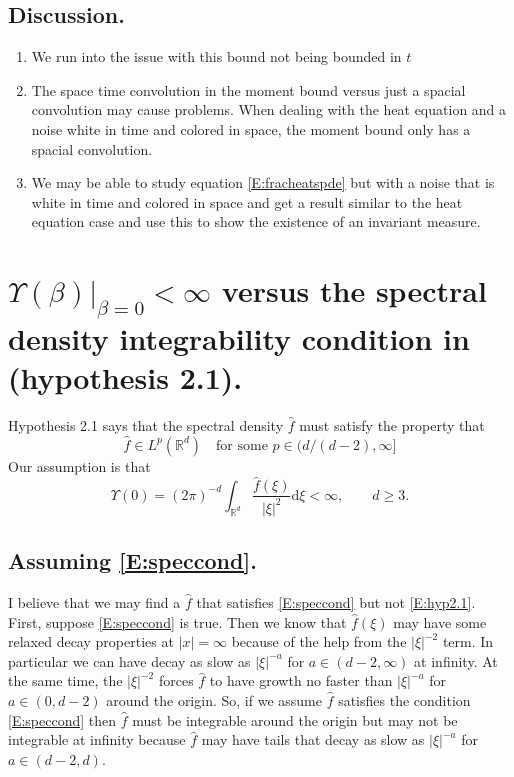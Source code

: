 \documentclass{article}
\numberwithin{equation}{section}
\newcommand{\R}{\mathbb{R}}
\newcommand{\ud}{\ensuremath{\mathrm{d}}}
\begin{document}
\subsection{Discussion.}
	\begin{enumerate}
		\item We run into the issue with this bound not being bounded in $t$
		\item The space time convolution in the moment bound versus just a spacial convolution may cause problems. When dealing with the heat equation and a noise white in time and colored in space, the moment bound only has a spacial convolution.
		\item We may be able to study equation \eqref{E:fracheatspde} but with a noise that is white in time and colored in space and get a result similar to the heat equation case and use this to show the existence of an invariant measure.
	\end{enumerate}

\section{$\Upsilon(\beta) \vert_{\beta =0} < \infty$ versus the spectral density integrability condition in \cite{TZ98} (hypothesis 2.1).}
Hypothesis 2.1 \cite{TZ98} says that the spectral density $\hat{f}$ must satisfy the property that
	\begin{equation}\label{E:hyp2.1}
 \hat{f} \in L^p(\R^d) \quad \text{for some } p \in (d/(d-2), \infty]
 	\end{equation}
Our assumption is that
	\begin{equation}\label{E:speccond}
		\Upsilon(0) = (2\pi)^{-d} \int_{\R^d} \frac{\hat{f}(\xi)}{|\xi|^2} \ud \xi < \infty, \quad \quad d \ge 3.
	\end{equation}

\subsection{Assuming \eqref{E:speccond}.}

I believe that we may find a $\hat{f}$ that satisfies \eqref{E:speccond} but not \eqref{E:hyp2.1}. First, suppose \eqref{E:speccond} is true. Then we know that $\hat{f}(\xi)$ may have some relaxed decay properties at $|x| = \infty$ because of the help from the $|\xi|^{-2}$ term. In particular we can have decay as slow as $|\xi|^{-a}$ for $a \in (d-2,\infty)$ at infinity. At the same time, the $|\xi|^{-2}$ forces $\hat{f}$ to have growth no faster than $|\xi|^{-a}$ for $a \in (0,d-2)$ around the origin. So, if we assume $\hat{f}$ satisfies the condition \eqref{E:speccond} then $\hat{f}$ must be integrable around the origin but may not be integrable at infinity because $\hat{f}$ may have tails that decay as slow as $|\xi|^{-a}$ for $a \in (d-2,d)$.
\end{document}
